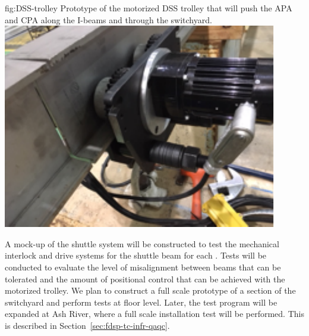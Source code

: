 \begin{dunefigure}{fig:DSS-trolley}
  {Prototype of the motorized DSS trolley that will push the APA and CPA along the I-beams and through the switchyard.}
\includegraphics[width=.49\textwidth]{graphics/DSS-trolley.pdf}
\end{dunefigure}



A mock-up of the shuttle system will be constructed to test the
mechanical interlock and drive systems for the shuttle beam
for each .  Tests will be conducted to evaluate the level of
misalignment between beams that can be tolerated and the amount of
positional control that can be achieved with the motorized trolley. We plan to construct a full scale prototype of a section of the  switchyard and perform tests at floor level. Later, the test program will be expanded at Ash River, where a full scale installation test will be performed. This is described in %
Section~\ref{sec:fdsp-tc-infr-qaqc}.
